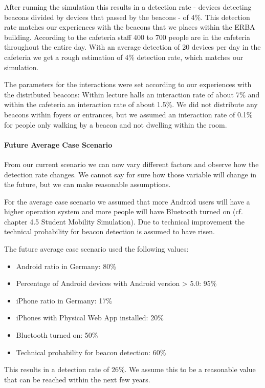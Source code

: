 After running the simulation this results in a detection rate - devices detecting beacons divided by devices that passed by the beacons - of 4\%. This detection rate matches our experiences with the beacons that we places within the ERBA building. According to the cafeteria staff 400 to 700 people are in the cafeteria throughout the entire day. With an average detection of 20 devices per day in the cafeteria we get a rough estimation of 4\% detection rate, which matches our simulation.
\par The parameters for the interactions were set according to our experiences with the distributed beacons: Within lecture halls an interaction rate of about 7\% and within the cafeteria an interaction rate of about 1.5\%. We did not distribute any beacons within foyers or entrances, but we assumed an interaction rate of 0.1\% for people only walking by a beacon and not dwelling within the room.


\paragraph{Future Average Case Scenario}

From our current scenario we can now vary different factors and observe how the detection rate changes. We cannot say for sure how those variable will change in the future, but we can make reasonable assumptions.
\par For the average case scenario we assumed that more Android users will have a higher operation system and more people will have Bluetooth turned on (cf. chapter 4.5 Student Mobility Simulation). 
Due to technical improvement the technical probability for beacon detection is assumed to have risen. 

The future average case scenario used the following values:
\begin{itemize}
\item Android ratio in Germany: 80\%
\item Percentage of Android devices with Android version > 5.0: 95\%
\item iPhone ratio in Germany: 17\%
\item iPhones with Physical Web App installed: 20\%
\item Bluetooth turned on: 50\%
\item Technical probability for beacon detection: 60\%
\end{itemize}

This results in a detection rate of 26\%. We assume this to be a reasonable value that can be reached within the next few years.

